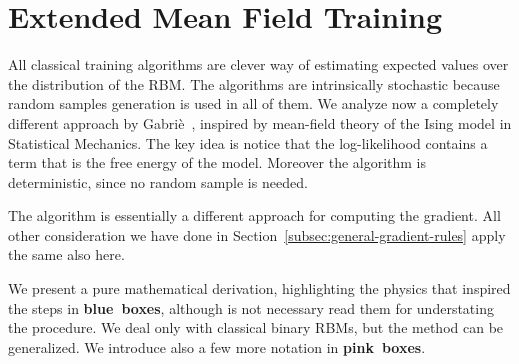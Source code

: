 
\section{Extended Mean Field Training}
All classical training algorithms are clever way of estimating expected values
over the distribution of the RBM. The algorithms are intrinsically stochastic
because random samples generation is used in all of them. We analyze now a completely
different approach by Gabriè~\cite{gabrie18training}, inspired by mean-field
theory of the  Ising model in Statistical Mechanics. The key idea is notice that the
log-likelihood contains a term that is the free energy of the model. Moreover the
algorithm is deterministic, since no random sample is needed.

The algorithm is essentially a different approach for computing the gradient. All other
consideration we have done in Section~\ref{subsec:general-gradient-rules} apply the same
also here.

We present a pure mathematical derivation, highlighting the physics that inspired the
steps in {\bf \color{physics-blue}blue~boxes}, although is not necessary read them for
understating the procedure. We deal only with classical binary RBMs,
but the method can be generalized. We introduce also a few more notation in
{\bf \color{pink-notation}pink~boxes}.

\newcommand{\FEn}[2]{F{\left[#1;#2\right]}}
\newcommand{\Gam}[2]{\Gamma{\left[#1;#2\right]}}
\newcommand{\DistributionMean}[4]{\left\langle#1\right\rangle_{#4{\left[#2;#3\right]}}}
\newcommand{\Fmean}[3]{\DistributionMean{#1}{#2}{#3}{f}}
\newcommand{\Gmean}[3]{\DistributionMean{#1}{#2}{#3}{\gamma}}
\newcommand{\qhat}[1]{\vec{\hat{q}}{(#1)}}
\newcommand{\Lambd}[2]{\vec{\lambda}{\left[#1;#2\right]}}

\newcommand{\lgt}[2]{\lambda_t{\left[#1;#2\right]}}
\newcommand{\lvi}[2]{\lambda_i^v{\left[#1;#2\right]}}
\newcommand{\lhj}[2]{\lambda_j^h{\left[#1;#2\right]}}
\newcommand{\lgtz}[1]{\lgt{#1}{0}}
\newcommand{\lviz}[1]{\lvi{#1}{0}}
\newcommand{\lhjz}[1]{\lhj{#1}{0}}
\newcommand{\lgtm}[1]{\lgt{\vec{m}}{#1}}
\newcommand{\lvim}[1]{\lvi{\vec{m}}{#1}}
\newcommand{\lhjm}[1]{\lhj{\vec{m}}{#1}}
\newcommand{\lgtmz}{\lgt{\vec{m}}{0}}
\newcommand{\lvimz}{\lvi{i\vec{m}}{0}}
\newcommand{\lhjmz}{\lhj{\vec{m}}{0}}

